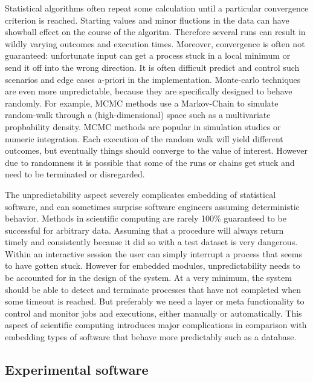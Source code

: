 \documentclass{article}
\begin{document}
Statistical algorithms often repeat some calculation until a particular convergence criterion is reached. Starting values and minor fluctions in the data can have showball effect on the course of the algoritm. Therefore several runs can result in wildly varying outcomes and execution times. Moreover, convergence is often not guaranteed: unfortunate input can get a process stuck in a local minimum or send it off into the wrong direction. It is often difficult predict and control such scenarios and edge cases a-priori in the implementation. Monte-carlo techniques are even more unpredictable, because they are specifically designed to behave randomly. For example, MCMC methods use a Markov-Chain to simulate random-walk through a (high-dimensional) space such as a multivariate propbability density. MCMC methods are popular in simulation studies or numeric integration. Each execution of the random walk will yield different outcomes, but eventually things should converge to the value of interest. However due to randomness it is possible that some of the runs or chains get stuck and need to be terminated or disregarded.

The unpredictability aspect severely complicates embedding of statistical software, and can sometimes surprise software engineers assuming deterministic behavior. Methods in scientific computing are rarely 100\% guaranteed to be successful for arbitrary data. Assuming that a procedure will always return timely and consistently because it did so with a test dataset is very dangerous. Within an interactive session the user can simply interrupt a process that seems to have gotten stuck. However for embedded modules, unpredictability needs to be accounted for in the design of the system. At a very minimum, the system should be able to detect and terminate processes that have not completed when some timeout is reached. But preferably we need a layer or meta functionality to control and monitor jobs and executions, either manually or automatically.  This aspect of scientific computing introduces major complications in comparison with embedding types of software that behave more predictably such as a database. 

\subsection{Experimental software}
\end{document}
